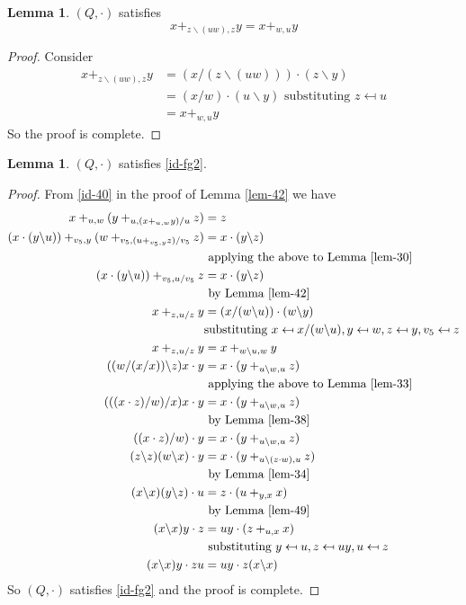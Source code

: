 \documentclass[12pt, twoside, openright]{report}
\theoremstyle{definition}
\newtheorem{lem}[thm]{Lemma}
\newcommand{\ldv}{\backslash}       %
\newcommand{\rdv}{/}                %
\begin{document}
\begin{lem}\label{lem-49}
  $(Q, \cdot)$ satisfies
  \[x +_{z\ldv(uw), z} y = x +_{w, u} y\]
\end{lem}

\begin{proof}
  Consider
  \begin{align*}
    x +_{z\ldv(uw), z} y &= (x\rdv (z\ldv (uw)))\cdot (z\ldv y)\\
    &= (x\rdv w)\cdot (u\ldv y)\text{ substituting $z\mapsfrom u$}\\
    &= x +_{w, u} y
  \end{align*}
  So the proof is complete.
\end{proof}

\begin{lem}\label{lem-identities}
  $(Q, \cdot)$ satisfies \ref{id-fg2}.
\end{lem}

\begin{proof}
  From \ref{id-40} in the proof of Lemma \ref{lem-42} we have
  \begin{align*}{2}
    x +_{u, w} (y +_{u, (x +_{u, w} y)\rdv u} z) &= z\\
    (x\cdot (y\ldv u)) +_{v_5, y} (w +_{v_5, (u +_{v_5, y} z)\rdv v_5} z) &= x\cdot (y\ldv z)\\
      &\text{ applying the above to Lemma \ref{lem-30}}\\
    (x\cdot (y\ldv u)) +_{v_5, u\rdv v_5} z &= x\cdot (y\ldv z)\\
      &\text{ by Lemma \ref{lem-42}}\\
    x +_{z, u\rdv z} y &= (x\rdv(w\ldv u))\cdot (w\ldv y)\\
      &\text{substituting $x\mapsfrom x\rdv(w\ldv u), y\mapsfrom w, z\mapsfrom y, v_5\mapsfrom z$}\\
    x +_{z, u\rdv z} y &= x +_{w\ldv u, w} y\\
    ((w\rdv(x\rdv x))\ldv z)x \cdot y &= x\cdot (y +_{u\ldv w, u} z)\\
      &\text{ applying the above to Lemma \ref{lem-33}}\\
    (((x\cdot z)\rdv w)\rdv x)x\cdot y &= x\cdot (y +_{u\ldv w, u} z)\\
      &\text{ by Lemma \ref{lem-38}}\\
    ((x\cdot z)\rdv w)\cdot y &= x\cdot (y +_{u\ldv w, u} z)\\
    (z\ldv z)(w\ldv x)\cdot y &= x\cdot (y +_{u\ldv(z\cdot w), u} z)\\
      &\text{ by Lemma \ref{lem-34}}\\
    (x\ldv x)(y\ldv z)\cdot u &= z\cdot (u +_{y, x} x)\\
      &\text{ by Lemma \ref{lem-49}}\\
    (x\ldv x)y\cdot z &= uy\cdot (z +_{u, x} x)\\
      &\text{ substituting $y\mapsfrom u, z\mapsfrom uy, u\mapsfrom z$}\\
    (x\ldv x)y\cdot zu &= uy\cdot z(x\ldv x) 
  \end{align*}
  So $(Q, \cdot)$ satisfies \ref{id-fg2} and the proof is complete.
\end{proof}
\end{document}

